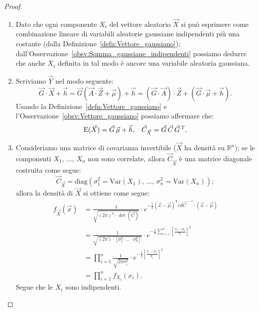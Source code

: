         \begin{proof}
            \hfill
            \begin{enumerate}
                \item Dato che ogni componente $X_i$ del vettore aleatorio $\vec{X}$ si può esprimere come 
                    combinazione lineare di variabili aleatorie gaussiane indipendenti più una 
                    costante (dalla Definizione~\ref{defn:Vettore_gaussiano}); 
                    dall'Osservazione~\ref{obsv:Somma_gaussiane_indipendenti} possiamo dedurre che anche $X_i$ 
                    definita in tal modo è ancore una variabile aleatoria gaussiana.
                \item Scriviamo $\vec{Y}$ nel modo seguente: \[
                        \vec{G} \cdot \vec{X} + \vec{h} = \vec{G}(\vec{A} \cdot \vec{Z} + \vec{\mu}) + \vec{h}
                        = (\vec{G} \cdot \vec{A})\cdot \vec{Z} + (\vec{G} \cdot \vec{\mu} + \vec{h})
                    .\] Usando la Definizione~\ref{defn:Vettore_gaussiano} e 
                    l'Osservazione~\ref{obsv:Vettore_gaussiano} possiamo affermare che:
                    \begin{align*}
                        \text{E}(\vec{X}) = \vec{G}\, \vec{\mu} + \vec{h}, & &
                        \vec{C}_{\vec{X}} = \vec{G}\, \vec{C}\, \vec{G}^{\text{\,T}}
                    .\end{align*}
                \item Consideriamo una matrice di covarianza invertibile ($\vec{X}$ ha densità su 
                    $\mathbb{R}^n$); se le componenti $X_1,\, \ldots,\, X_{n}$ non sono correlate, allora 
                    $\vec{C}_{\vec{X}}$ è una matrice diagonale costruita come segue: \[
                        \vec{C}_{\vec{X}} = \text{diag}\left(\sigma_1^2 = \text{Var}(X_1),\, 
                        \ldots,\, \sigma_n^2 = \text{Var}(X_n)\right)
                    ;\] allora la densità di $\vec{X}$ si ottiene come segue:
                    \begin{align*}
                        f_{\vec{X}}(\vec{x}) &= \frac{1}{\sqrt{(2\pi)^n \cdot \det(\vec{C})}} \cdot e^{-\frac{1}{2}(\vec{x}-\vec{\mu})^{\text{T}}cd \vec{C}^{\,-1}\cdot(\vec{x}-\vec{\mu})} \\
                        &= \frac{1}{\sqrt{(2\pi)\cdot [\sigma_1^2\cdot \ldots\cdot \sigma_n^2]}} \cdot e^{-\frac{1}{2} \sum_{i=1}^{n} \left[\frac{x_i-\mu_i}{\sigma_i}\right]^2} \\
                        &= \prod_{i=1}^{n} \frac{1}{\sqrt{2\pi \sigma_i^2}} \cdot e^{-\frac{1}{2}\left[\frac{x_i-\mu_i}{\sigma_i}\right]^2} \\
                        &= \prod_{i=1}^{n} f_{X_i}(x_i)
                    .\end{align*}
                    Segue che le $X_i$ sono indipendenti. \qedhere
            \end{enumerate}
        \end{proof}
